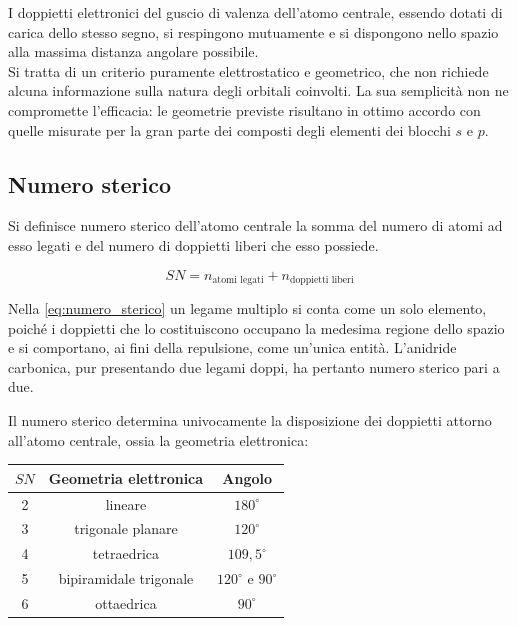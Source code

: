 I doppietti elettronici del guscio di valenza dell'atomo centrale, essendo dotati di carica dello stesso segno, si respingono mutuamente e si dispongono nello spazio alla massima distanza angolare possibile.\\

Si tratta di un criterio puramente elettrostatico e geometrico, che non richiede alcuna informazione sulla natura degli orbitali coinvolti. La sua semplicità non ne compromette l'efficacia: le geometrie previste risultano in ottimo accordo con quelle misurate per la gran parte dei composti degli elementi dei blocchi $s$ e $p$.

\subsection{Numero sterico}

Si definisce numero sterico dell'atomo centrale la somma del numero di atomi ad esso legati e del numero di doppietti liberi che esso possiede.

\begin{equation}
    SN = n_{\text{atomi legati}} + n_{\text{doppietti liberi}}
    \label{eq:numero_sterico}
\end{equation}

Nella \eqref{eq:numero_sterico} un legame multiplo si conta come un solo elemento, poiché i doppietti che lo costituiscono occupano la medesima regione dello spazio e si comportano, ai fini della repulsione, come un'unica entità. L'anidride carbonica, pur presentando due legami doppi, ha pertanto numero sterico pari a due.

Il numero sterico determina univocamente la disposizione dei doppietti attorno all'atomo centrale, ossia la geometria elettronica:

\begin{center}
    \begin{tabular}{ccc}
        \toprule
        $SN$ & Geometria elettronica & Angolo \\
        \midrule
        2 & lineare                  & $180^\circ$ \\
        3 & trigonale planare        & $120^\circ$ \\
        4 & tetraedrica              & $109{,}5^\circ$ \\
        5 & bipiramidale trigonale   & $120^\circ$ e $90^\circ$ \\
        6 & ottaedrica               & $90^\circ$ \\
        \bottomrule
    \end{tabular}
\end{center}

